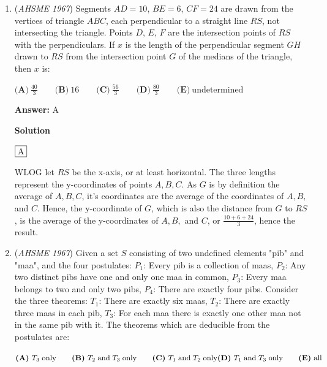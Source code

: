 \begin{enumerate}
 We now have a sum of $a(1 + r + r^2 + r^3 + r^4) = 211$, and we know that $r = \frac{3}{2}$ is the only possibility.  The terms in the parentheses happen to equal $\frac{211}{16}$ when you plug them in, so $a = 16$.

 Thus, the terms are $16, 24, 36, 54, 81$, and the first, third, and fifth terms are squares, with a sum of $133$, which is answer $\fbox{C}$.

 


	\item (\textit{AHSME 1967}) Segments $AD=10$, $BE=6$, $CF=24$ are drawn from the vertices of triangle $ABC$, each perpendicular to a straight line $RS$, not intersecting the triangle.  Points $D$, $E$, $F$ are the intersection points of $RS$ with the perpendiculars.  If $x$ is the length of the perpendicular segment $GH$ drawn to $RS$ from the intersection point $G$ of the medians of the triangle, then $x$ is:


 $\textbf{(A)}\ \frac{40}{3}\qquad \textbf{(B)}\ 16\qquad \textbf{(C)}\ \frac{56}{3}\qquad \textbf{(D)}\ \frac{80}{3}\qquad \textbf{(E)}\ \text{undetermined}$

 \textbf{Answer: }A



\textbf{Solution}

$\fbox{A}$

 WLOG let $RS$ be the x-axis, or at least horizontal. The three lengths represent the y-coordinates of points $A,B,C$. As $G$ is by definition the average of $A,B,C$, it's coordinates are the average of the coordinates of $A,B,$ and $C$. Hence, the y-coordinate of $G$, which is also the distance from $G$ to $RS$, is the average of the y-coordinates of $A,B,$ and $C$, or $\frac{10+6+24}{3}$, hence the result.

 


	\item (\textit{AHSME 1967}) Given a set $S$ consisting of two undefined elements "pib" and "maa", and the four postulates: $P_1$: Every pib is a collection of maas, $P_2$: Any two distinct pibs have one and only one maa in common, $P_3$: Every maa belongs to two and only two pibs, $P_4$: There are exactly four pibs.  Consider the three theorems: $T_1$: There are exactly six maas, $T_2$: There are exactly three maas in each pib, $T_3$: For each maa there is exactly one other maa not in the same pib with it.  The theorems which are deducible from the postulates are:


 $\textbf{(A)}\ T_3 \; \text{only}\qquad \textbf{(B)}\ T_2 \; \text{and} \; T_3 \; \text{only} \qquad \textbf{(C)}\ T_1 \; \text{and} \; T_2 \; \text{only}\\ \textbf{(D)}\ T_1 \; \text{and} \; T_3 \; \text{only}\qquad \textbf{(E)}\ \text{all}$


\end{enumerate}
